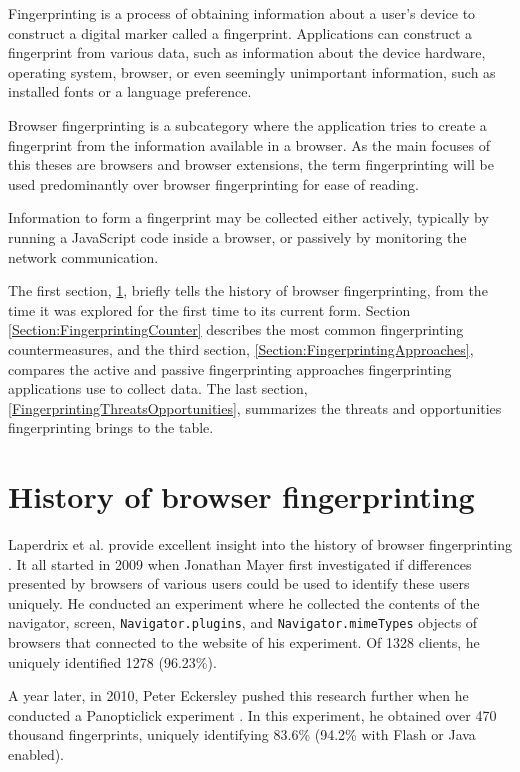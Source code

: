 Fingerprinting is a process of obtaining information about a user's device to construct a digital marker called a fingerprint. Applications can construct a fingerprint from various data, such as information about the device hardware, operating system, browser, or even seemingly unimportant information, such as installed fonts or a language preference.

Browser fingerprinting \cite{FingerprintingSurvey} is a subcategory where the application tries to create a fingerprint from the information available in a browser. As the main focuses of this theses are browsers and browser extensions, the term fingerprinting will be used predominantly over browser fingerprinting for ease of reading.

Information to form a fingerprint may be collected either actively, typically by running a JavaScript code inside a browser, or passively by monitoring the network communication.

The first section, \ref{Section:FingerprintingHistory}, briefly tells the history of browser fingerprinting, from the time it was explored for the first time to its current form. Section \ref{Section:FingerprintingCounter} describes the most common fingerprinting countermeasures, and the third section, \ref{Section:FingerprintingApproaches}, compares the active and passive fingerprinting approaches fingerprinting applications use to collect data. The last section, \ref{FingerprintingThreatsOpportunities}, summarizes the threats and opportunities fingerprinting brings to the table.

\section{History of browser fingerprinting}
\label{Section:FingerprintingHistory}

Laperdrix et al. provide excellent insight into the history of browser fingerprinting \cite{FingerprintingSurvey}. It all started in 2009 when Jonathan Mayer first investigated if differences presented by browsers of various users could be used to identify these users uniquely. He conducted an experiment where he collected the contents of the navigator, screen, \texttt{Navigator.plugins}, and \texttt{Navigator.mimeTypes} objects of browsers that connected to the website of his experiment. Of 1328 clients, he uniquely identified 1278 (96.23\%).

A year later, in 2010, Peter Eckersley pushed this research further when he conducted a Panopticlick experiment \cite{EckersleyHowUnique}. In this experiment, he obtained over 470 thousand fingerprints, uniquely identifying 83.6\% (94.2\% with Flash or Java enabled).

